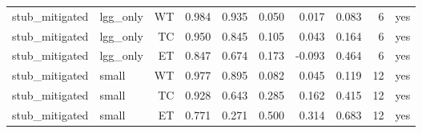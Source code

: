 \begin{table}[t]
\begin{tabular}{llrrrrrrrr}
stub\_mitigated & lgg\_only & WT & 0.984 & 0.935 & 0.050 & 0.017 & 0.083 & 6 & yes \\
stub\_mitigated & lgg\_only & TC & 0.950 & 0.845 & 0.105 & 0.043 & 0.164 & 6 & yes \\
stub\_mitigated & lgg\_only & ET & 0.847 & 0.674 & 0.173 & -0.093 & 0.464 & 6 & yes \\
stub\_mitigated & small & WT & 0.977 & 0.895 & 0.082 & 0.045 & 0.119 & 12 & yes \\
stub\_mitigated & small & TC & 0.928 & 0.643 & 0.285 & 0.162 & 0.415 & 12 & yes \\
stub\_mitigated & small & ET & 0.771 & 0.271 & 0.500 & 0.314 & 0.683 & 12 & yes \\
\hline
\end{tabular}
\end{table}
